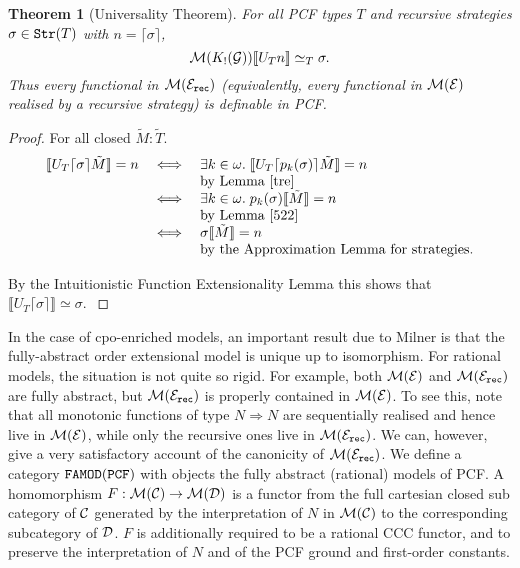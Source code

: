 \documentclass[11pt]{article}
\newtheorem{theorem}{Theorem}[section]
\newcommand{\E}{{\cal E}}
\newcommand{\G}{{\cal G}}
\newcommand{\M}{{\cal M}}
\begin{document}
\begin{theorem}[Universality Theorem]
For all PCF types $T$ and recursive strategies $\sigma\in{\tt Str}(T)$ with
$n=\lceil\sigma\rceil$,
$$\M(K_{!}(\G))\llbracket U_T n\rrbracket\simeq_T\sigma.$$
Thus every functional in $\M(\E_{\tt rec})$ (equivalently, every functional
in $\M(\E)$ realised by a recursive strategy) is definable in PCF.
\end{theorem}

\begin{proof} For all closed $\tilde{M}:\tilde{T}$.
\[\begin{array}{lll}
\llbracket U_T\lceil\sigma\rceil\tilde{M}\rrbracket = n &\iff&\exists
k\in\omega.\; \llbracket U_T\lceil p_k(\sigma)\rceil
\tilde{M}\rrbracket= n\\
&& \mbox{by Lemma \ref{tre}} \\
&\iff& \exists k\in\omega.\; p_k(\sigma)\llbracket \tilde{M}\rrbracket
=n\\
&& \mbox{by Lemma \ref{522}} \\
&\iff&\sigma \llbracket\tilde{M}\rrbracket = n \\
&&\mbox{by the Approximation Lemma for strategies.}
\end{array}\]

\noindent By the Intuitionistic Function Extensionality Lemma this
shows that $\llbracket
U_T\lceil\sigma\rceil\rrbracket\simeq\sigma.\; $
\end{proof}


In the case of cpo-enriched models, an important result due to Milner
is that the fully-abstract order extensional model is unique up to isomorphism.
For rational models, the situation is not quite so rigid. For example, both
$\M(\E)$ and $\M(\E_{\tt rec})$ are fully abstract, but $\M(\E_{\tt rec})$ is
properly contained in $\M(\E)$. To see this, note that all monotonic functions
of type $N\Rightarrow N$ are sequentially realised and hence live in
$\M(\E)$, while only the recursive ones live in $\M(\E_{\tt rec})$.
We can, however, give a very satisfactory account of the canonicity of
$\M(\E_{\tt rec})$. We define a category ${\tt FAMOD(PCF)}$ with objects
the fully abstract (rational) models of PCF.
A homomorphism $F:\M({\cal C})\rightarrow {\cal M}({\cal D})$ is a functor
from the full cartesian closed sub category of $\cal C$ generated by
the interpretation
of $N$ in $\M({\cal C})$ to the corresponding subcategory of $\cal D$.
$F$ is additionally required to be a rational CCC functor, and to preserve the
interpretation of $N$ and of the PCF ground and first-order constants.
\end{document}
